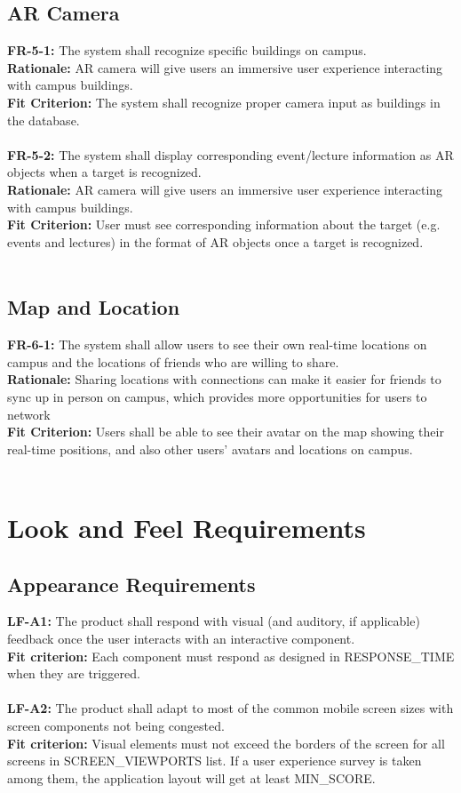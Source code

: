 \documentclass[12pt]{article}
\begin{document}
\subsection{AR Camera}
    \textbf{FR-5-1:} The system shall recognize specific buildings on campus.\\
    \textbf{Rationale:} AR camera will give users an immersive user experience interacting with campus buildings.\\
    \textbf{Fit Criterion:} The system shall recognize proper camera input as buildings in the database.\\\\
    \textbf{FR-5-2:} The system shall display corresponding event/lecture information as AR objects when a target is recognized.\\
    \textbf{Rationale:} AR camera will give users an immersive user experience interacting with campus buildings.\\
    \textbf{Fit Criterion:} User must see corresponding information about the target (e.g. events and lectures) in the format of AR objects once a target is recognized.\\\\

\subsection{Map and Location}
    \textbf{FR-6-1:} The system shall allow users to see their own real-time locations on campus and the locations of friends who are willing to share.\\
    \textbf{Rationale:} Sharing locations with connections can make it easier for friends to sync up in person on campus, which provides more opportunities for users to network\\
    \textbf{Fit Criterion:} Users shall be able to see their avatar on the map showing their real-time positions, and also other users' avatars and locations on campus.\\\\

\section{Look and Feel Requirements}
\subsection{Appearance Requirements}
  \textbf{LF-A1:} The product shall respond with visual (and auditory, if applicable) feedback once the user interacts with an interactive component.\\
  \textbf{Fit criterion:} Each component must respond as designed in RESPONSE\_TIME when they are triggered.\\\\
  \textbf{LF-A2:} The product shall adapt to most of the common mobile screen sizes with screen components not being congested.\\
  \textbf{Fit criterion:} Visual elements must not exceed the borders of the screen for all screens in SCREEN\_VIEWPORTS list. If a user experience survey is taken among them, the application layout will get at least MIN\_SCORE.\\
\end{document}

